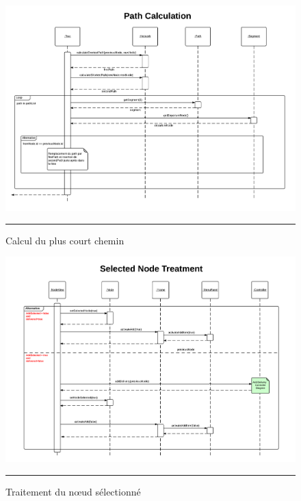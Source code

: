 \begin{figure}[H]
	\centering
		\includegraphics[width=\textwidth,height=\textheight,keepaspectratio, angle=90]{Figures/ajout_livraison6}
		\rule{35em}{0.5pt}
	\caption[Calcul du plus court chemin]{Calcul du plus court chemin}
\end{figure}
\clearpage
\begin{figure}[H]
	\centering
		\includegraphics[width=\textwidth,height=\textheight,keepaspectratio, angle=90]{Figures/ajout_livraison7}
		\rule{35em}{0.5pt}
	\caption[Traitement du nœud sélectionné]{Traitement du nœud sélectionné}
\end{figure}
\clearpage
